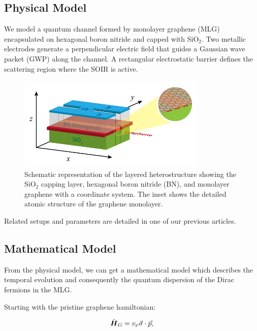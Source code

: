 \subsection{Physical Model}\label{subsec:physical-model}

We model a quantum channel formed by monolayer graphene (MLG) encapsulated on hexagonal boron nitride and capped with SiO$_2$.
Two metallic electrodes generate a perpendicular electric field that guides a Gaussian wave packet (GWP) along the channel.
A rectangular electrostatic barrier defines the scattering region where the SOIR is active.

\begin{figure}[htbp]
    \centering
    \includegraphics[width=0.8\textwidth]{../assets/images/sandwichGrafeno_pantalla}
    \caption{Schematic representation of the layered heterostructure showing the SiO$_2$ capping layer, hexagonal boron nitride (BN), and monolayer graphene with a coordinate system. The inset shows the detailed atomic structure of the graphene monolayer.}
    \label{fig:physical-model}
\end{figure}

Related setups and parameters are detailed in one of our previous articles\cite{Serna2019}.

\subsection{Mathematical Model}\label{subsec:mathematical-model}

From the physical model, we can get a mathematical model which describes the temporal evolution and consequently the quantum dispersion of the Dirac fermions in the MLG\@.

Starting with the pristine graphene hamiltonian\cite{Geimk2007}:

\begin{equation}
    \label{eq:pristGr}
    \hat{\mbox{\boldmath $H$}}_G = v_{\mbox{\tiny F}}\vec{\mathbf{\sigma}}\cdot\vec{p},
\end{equation}

